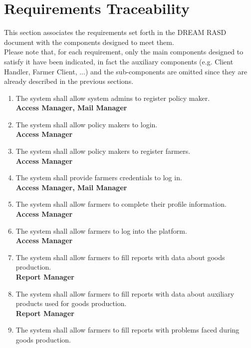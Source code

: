 \documentclass[10pt]{article} %
\begin{document}
\section{Requirements Traceability}
This section associates the requirements set forth in the DREAM RASD document with the components designed to meet them.\\
Please note that, for each requirement, only the main components designed to satisfy it have been indicated, in fact the auxiliary components (e.g. Client Handler, Farmer Client, ...) and the sub-components are omitted since they are already described in the previous sections.
\begin{enumerate}[label=\textbf{R\arabic*}]
    \item \label{req:pmReg} The system shall allow system admins to register policy maker.
    \\\textbf{Access Manager, Mail Manager}    
    \item \label{req:pmLogin} The system shall allow policy makers to login. 
    \\\textbf{Access Manager}    
    \item \label{req:farmerReg1} The system shall allow policy makers to register farmers.    
    \\\textbf{Access Manager} 
    \item \label{req:farmerCreds} The system shall provide farmers credentials to log in.    
    \\\textbf{Access Manager, Mail Manager} 
    \item \label{req:farmerReg2} The system shall allow farmers to complete their profile information.    
    \\\textbf{Access Manager} 
    \item \label{req:farmerLogin} The system shall allow farmers to log into the platform.      
    \\\textbf{Access Manager} 
    \item \label{req:farmerReport1} The system shall allow farmers to fill reports with data about goods production.    
    \\\textbf{Report Manager} 
    \item \label{req:farmerReport2} The system shall allow farmers to fill reports with data about auxiliary products used for goods production.    
    \\\textbf{Report Manager} 
    \item \label{req:farmerReport3} The system shall allow farmers to fill reports with problems faced during goods production.     

\end{enumerate}
\end{document}
